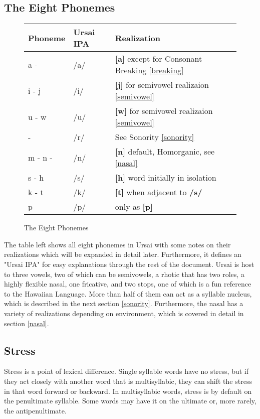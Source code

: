 \documentclass[11pt,letterpaper]{article}
\makeatletter
\newcommand{\epsi}{\textipa{E}}
\newcommand{\engma}{\textipa{N}}
\newcommand{\rson}{\textipa{@}\textrhoticity}
\newcommand{\flap}{\textipa{R}}
\makeatother
\begin{document}
	\subsection{The Eight Phonemes}
		\begin{wrapfigure}{l}{0.65\textwidth}
  			\begin{tabular}{|l|l|l|}
  				\hline
  				Phoneme             & Ursai IPA & Realization \\ \hline \hline
  				a - \epsi           & /a/ & \textbf{[a]} except for Consonant Breaking \ref{breaking}\\
  				i - j               & /i/ & \textbf{[j]} for semivowel realizaion \ref{semivowel}   \\
  				u - w               & /u/ & \textbf{[w]} for semivowel realizaion \ref{semivowel}   \\
  				\flap\space - \rson & /r/ & See Sonority \ref{sonority} \\ 
  				m - n - \engma      & /n/ & \textbf{[n]} default, Homorganic, see \ref{nasal} \\
  				s - h               & /s/ & \textbf{[h]} word initially in isolation \\
  				k - t               & /k/ & \textbf{[t]} when adjacent to \textbf{/s/} \\
  				p                   & /p/ & only as \textbf{[p]} \\ \hline
  			\end{tabular}
  			\caption{The Eight Phonemes}
		\end{wrapfigure}
		\par
		The table left shows all eight phonemes in Ursai with some notes on their realizations which will be expanded in detail later.  Furthermore, it defines an "Ursai IPA" for easy explanations through the rest of the document.  Ursai is host to three vowels, two of which can be semivowels, a rhotic that has two roles, a highly flexible nasal, one fricative, and two stops, one of which is a fun reference to the Hawaiian Language\cite{HawaiianPhonology}.  More than half of them can act as a syllable nucleus, which is described in the next section \ref{sonority}.  Furthermore, the nasal has a variety of realizations depending on environment, which is covered in detail in section \ref{nasal}.
	\subsection{Stress}\label{stress}
	\par 
	Stress is a point of lexical difference.  Single syllable words have no stress, but if they act closely with another word that is multisyllabic, they can shift the stress in that word forward or backward.  In multisyllabic words, stress is by default on the penultimate syllable.  Some words may have it on the ultimate or, more rarely, the antipenultimate.
\end{document}
